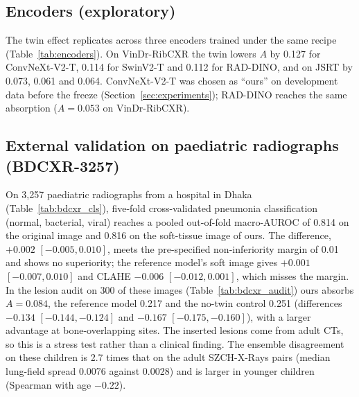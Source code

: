\subsection{Encoders (exploratory)}
The twin effect replicates across three encoders trained under the same recipe (Table~\ref{tab:encoders}). On VinDr-RibCXR the twin lowers
$A$ by 0.127 for ConvNeXt-V2-T, 0.114 for SwinV2-T and 0.112 for RAD-DINO, and on JSRT by 0.073, 0.061 and 0.064. ConvNeXt-V2-T was chosen
as ``ours'' on development data before the freeze (Section~\ref{sec:experiments}); RAD-DINO reaches the same absorption ($A=0.053$ on
VinDr-RibCXR).
\begin{table}[htbp]
\centering\small
\caption{Twin regulariser per encoder (exploratory): absorption difference to the matched no-twin control and its interaction with bone
overlap; three seeds per model (seeds 0--2), SZCH on its 51 held-out images.}
\label{tab:encoders}
\end{table}

\subsection{External validation on paediatric radiographs (BDCXR-3257)}
\label{sec:bdcxr}
On 3,257 paediatric radiographs from a hospital in Dhaka (Table~\ref{tab:bdcxr_cls}), five-fold cross-validated pneumonia classification
(normal, bacterial, viral) reaches a pooled out-of-fold macro-AUROC of 0.814 on the original image and 0.816 on the soft-tissue image of
ours. The difference, $+0.002$ $[-0.005,0.010]$, meets the pre-specified non-inferiority margin of 0.01 and shows no superiority; the
reference model's soft image gives $+0.001$ $[-0.007,0.010]$ and CLAHE $-0.006$ $[-0.012,0.001]$, which misses the margin. In the lesion audit
on 300 of these images (Table~\ref{tab:bdcxr_audit}) ours absorbs $A=0.084$, the reference model 0.217 and the no-twin control 0.251
(differences $-0.134$ $[-0.144,-0.124]$ and $-0.167$ $[-0.175,-0.160]$), with a larger advantage at bone-overlapping sites. The inserted
lesions come from adult CTs, so this is a stress test rather than a clinical finding. The ensemble disagreement on these children is 2.7 times
that on the adult SZCH-X-Rays pairs (median lung-field spread 0.0076 against 0.0028) and is larger in younger children (Spearman with age
$-0.22$).
\begin{table}[htbp]
\centering\small
\caption{BDCXR-3257: pneumonia classification (normal, bacterial, viral), five folds over near-duplicate groups $\times$ three seeds;
pooled out-of-fold macro-AUROC, per-fold mean $\pm$ SD and the difference to the original image (group bootstrap).}
\label{tab:bdcxr_cls}
\end{table}
\begin{table}[htbp]
\centering\small
\caption{BDCXR-3257: lesion audit on a fixed class-stratified subset of 300 images (1,800 sites).}
\label{tab:bdcxr_audit}
\end{table}
